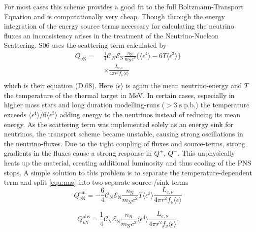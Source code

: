 \documentclass[fleqn,usenatbib]{mnras}
\begin{document}
\begin{appendices}
 For most cases this scheme provides a good fit to the full Boltzmann-Transport Equation and is computationally very cheap. Though through the energy integration of the energy source terms necessary for calculating the neutrino fluxes an inconsistency  arises in the treatment of the Neutrino-Nucleon Scattering.
 S06 uses the scattering term calculated by \cite{Tubbs1979}
  \begin{equation}\label{equ:nns}
  \begin{aligned}
    Q_{\mathrm{\nu N}} = \; & \frac{1}{4} \mathcal{C}_N \mathcal{E}_{\mathrm{N}} \frac{n_{\mathrm{N}}}{m_{\mathrm{N}}c^2}
    \{\langle \epsilon^4 \rangle - 6 T\langle \epsilon^3 \rangle  \} \\
    & \times  \frac{L_{e,\nu}}{4\pi r^2 f_{\nu}\langle \epsilon \rangle}\\
 \end{aligned}
 \end{equation}
 which is their equation (D.68). Here $\langle \epsilon \rangle$ is again the mean neutrino-energy and $T$ the temperature of the thermal target in MeV.
 In certain cases, especially in higher mass stars and long duration modelling-runs ($ > 3 \; \mathrm{s}$ p.b.) the temperature exceeds $\langle \epsilon^4 \rangle / 6 \langle \epsilon^3 \rangle $ adding energy to the neutrinos instead of reducing its mean energy. As the scattering term was implemented solely as an energy sink for neutrinos, the transport scheme became unstable, causing strong oscillations in the neutrino-fluxes. Due to the tight coupling of fluxes and source-terms, strong gradients in the fluxes cause a strong response in $Q^+$, $Q^-$. This unphysically heats up the material, creating additional luminosity and thus cooling of the PNS stops.
 A simple solution to this problem is to separate the temperature-dependent term and split \ref{equ:nns} into two separate source-/sink terms
   \begin{equation}\label{equ:nns1}
    Q^{\mathrm{em}}_{\nu \mathrm{N}} = - \frac{6}{4} \mathcal{C}_{\mathrm{N}} \mathcal{E}_{\mathrm{N}} \frac{n_{\mathrm{N}}}{m_{\mathrm{N}}c^2}
    T \langle \epsilon^3 \rangle \frac{L_{e,\nu}}{4\pi r^2 f_{\nu}\langle \epsilon \rangle}
 \end{equation}

 \begin{equation}\label{equ:nns2}
    Q^{\mathrm{abs}}_{\nu \mathrm{N}} = \frac{1}{4} \mathcal{C}_{\mathrm{N}} \mathcal{E}_{\mathrm{N}} \frac{n_{\mathrm{N}}}{m_{\mathrm{N}}c^2}
    \langle \epsilon^4 \rangle \frac{L_{e,\nu}}{4\pi r^2 f_{\nu}\langle \epsilon \rangle}.
 \end{equation}


\end{appendices}
\end{document}
